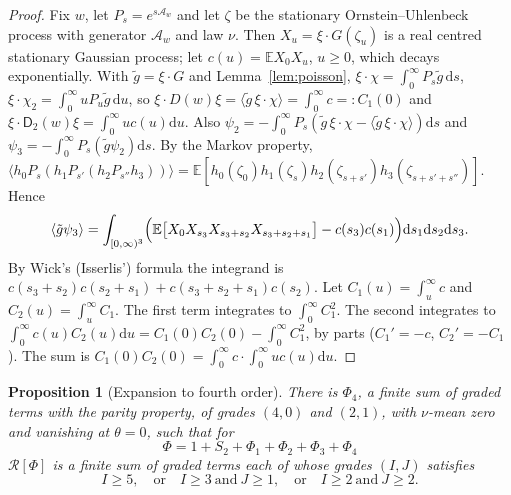 \documentclass[11pt]{article}
\newcommand{\dd}{\mathrm{d}}
\newcommand{\E}{\mathbb{E}}
\newcommand{\cA}{\mathcal{A}}
\newcommand{\cR}{\mathcal{R}}
\newcommand{\sD}{\mathsf{D}}
\newcommand{\avg}[1]{\langle #1\rangle}
\newtheorem{proposition}[theorem]{Proposition}
\theoremstyle{remark}
\begin{document}
\begin{proof}
Fix $w$, let $P_s = e^{s\cA_w}$ and let $\zeta$ be the stationary
Ornstein--Uhlenbeck process with generator $\cA_w$ and law $\nu$. Then
$X_u = \xi\cdot G(\zeta_u)$ is a real centred stationary Gaussian process;
let $c(u) = \E X_0X_u$, $u\ge0$, which decays exponentially. With
$\tilde g = \xi\cdot G$ and Lemma~\ref{lem:poisson},
$\xi\cdot\chi = \int_0^\infty P_s\tilde g\,\dd s$,
$\xi\cdot\chi_2 = \int_0^\infty uP_u\tilde g\,\dd u$, so
$\xi\cdot D(w)\xi = \avg{\tilde g\,\xi\cdot\chi} = \int_0^\infty c =: C_1(0)$ and
$\xi\cdot\sD_2(w)\xi = \int_0^\infty uc(u)\dd u$. Also
$\psi_2 = -\int_0^\infty P_s(\tilde g\,\xi\cdot\chi - \avg{\tilde g\,\xi\cdot\chi})\dd s$
and $\psi_3 = -\int_0^\infty P_s(\tilde g\psi_2)\dd s$. By the Markov property,
$\avg{h_0P_{s}(h_1P_{s'}(h_2P_{s''}h_3))}
= \E[h_0(\zeta_0)h_1(\zeta_s)h_2(\zeta_{s+s'})h_3(\zeta_{s+s'+s''})]$. Hence
\[
  \avg{\tilde g\psi_3} = \int_{[0,\infty)^3}\Bigl(
    \E\bigl[X_0X_{s_3}X_{s_3+s_2}X_{s_3+s_2+s_1}\bigr] - c(s_3)c(s_1)\Bigr)
    \dd s_1\dd s_2\dd s_3 .
\]
By Wick's (Isserlis') formula the integrand is
$c(s_3+s_2)c(s_2+s_1) + c(s_3+s_2+s_1)c(s_2)$. Let
$C_1(u) = \int_u^\infty c$ and $C_2(u) = \int_u^\infty C_1$. The first term
integrates to $\int_0^\infty C_1^2$. The second integrates to
$\int_0^\infty c(u)C_2(u)\dd u = C_1(0)C_2(0) - \int_0^\infty C_1^2$, by parts
($C_1' = -c$, $C_2' = -C_1$). The sum is
$C_1(0)C_2(0) = \int_0^\infty c\cdot\int_0^\infty uc(u)\dd u$.
\end{proof}

\begin{proposition}[Expansion to fourth order]\label{prop:exp}
There is $\Phi_4$, a finite sum of graded terms with the parity property, of
grades $(4,0)$ and $(2,1)$, with $\nu$-mean zero and vanishing at $\theta=0$,
such that for
\[
  \Phi = 1 + S_2 + \Phi_1 + \Phi_2 + \Phi_3 + \Phi_4
\]
$\cR[\Phi]$ is a finite sum of graded terms each of whose grades $(I,J)$
satisfies
\begin{equation}
  I\ge5,\quad\text{or}\quad I\ge3\ \text{and}\ J\ge1,\quad\text{or}\quad
  I\ge2\ \text{and}\ J\ge2 .
  \label{eq:goodgrades}
\end{equation}
\end{proposition}
\end{document}
